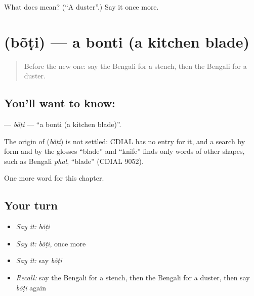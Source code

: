 \begin{tcolorbox}[breakable,colback=teal!4,colframe=teal!35!black,title={Before you move on}]
What does  mean? (\textquotedblleft{}A duster\textquotedblright{}.) Say it once more.
\end{tcolorbox}
\section[\texorpdfstring{\bn{বঁটি} (bõṭi)}{বঁটি (bõṭi)}]{ (bõṭi) — a bonti (a kitchen blade)}

\label{lesson:BN-C175-boti}



\begin{quote}
Before the new one: say the Bengali for a stench, then the Bengali for a duster.
\end{quote}

\subsection*{You'll want to know: }
\textbf{} — \emph{bõṭi} — \textquotedblleft{}a bonti (a kitchen blade)\textquotedblright{}.

\begin{cousinweb}
The origin of \textbf{} (\emph{bõṭi}) is not settled: CDIAL has no entry for it, and a search by form and by the glosses \textquotedblleft{}blade\textquotedblright{} and \textquotedblleft{}knife\textquotedblright{} finds only words of other shapes, such as Bengali \emph{phal}, \textquotedblleft{}blade\textquotedblright{} (CDIAL 9052).
\end{cousinweb}

\begin{grammarlens}[title={What you've built}]
One more word for this chapter.
\end{grammarlens}

\subsection*{Your turn}
\begin{itemize}
\raggedright
  \item \emph{Say it:} \emph{bõṭi}
  \item \emph{Say it:} \emph{bõṭi}, once more
  \item \emph{Say it:} say \emph{bõṭi}
  \item \emph{Recall:} say the Bengali for a stench, then the Bengali for a duster, then say \emph{bõṭi} again
\end{itemize}

